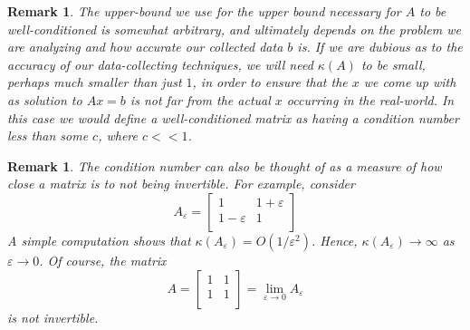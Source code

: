 \documentclass[12pt,reqno]{amsart}
\numberwithin{equation}{section}  %
\newcommand{\ee}{\varepsilon}
\newtheorem{remark}[theorem]{Remark}
\begin{document}
\begin{remark}
The upper-bound we use for the upper bound necessary for $A$ to be well-conditioned
is somewhat arbitrary, and ultimately depends on the problem we are analyzing
and how accurate our collected data $b$ is. If we are dubious as to 
the accuracy of our data-collecting techniques, we will 
need $\kappa(A)$ to be small,
perhaps much smaller than just $1$, in order to
ensure that the $x$ we come up with as solution to $Ax = b$ is not far
from the actual $x$ occurring in the real-world. In this case we would define
a well-conditioned matrix as having a condition number less than some $c$, where
$c << 1$. 
\end{remark}
\begin{remark}
The condition number can also be thought of as a measure of how close a matrix
is to not being invertible. For example, consider
\begin{equation*}
A_\ee = 
\begin{bmatrix}
1 & 1+ \ee \\
1 - \ee & 1 \\
\end{bmatrix}
\end{equation*}
A simple computation shows that $\kappa(A_\ee) = O(1/\ee^2)$.
Hence, $\kappa(A_\ee) \to \infty$ as $\ee \to 0$. Of course,
the matrix
\begin{equation*}
A = 
\begin{bmatrix}
1 & 1 \\
1  & 1 \\
\end{bmatrix}
 = \lim_{\ee \to 0} A_\ee
\end{equation*}
is not invertible.
\end{remark}
\end{document}

